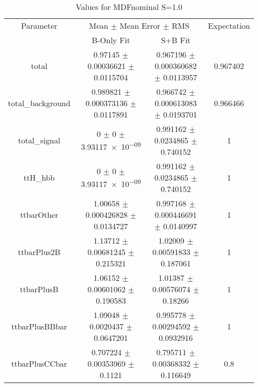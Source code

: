 \begin{table}
\centering
\caption{Values for MDFnominal S=1.0}
\begin{tabular}{cccc}
\toprule
Parameter & \multicolumn{2}{c}{Mean $\pm$ Mean Error $\pm$ RMS} & Expectation\\
 & B-Only Fit & S+B Fit & \\
\midrule
total & \num{0.97145} $\pm$ \num{0.00036621} $\pm$ \num{0.0115704} & \num{0.967196} $\pm$ \num{0.000360682} $\pm$ \num{0.0113957} & \num{0.967402}\\
total\_background & \num{0.989821} $\pm$ \num{0.000373136} $\pm$ \num{0.0117891} & \num{0.966742} $\pm$ \num{0.000613083} $\pm$ \num{0.0193701} & \num{0.966466}\\
total\_signal & \num{0} $\pm$ \num{0} $\pm$ \num{3.93117e-09} & \num{0.991162} $\pm$ \num{0.0234865} $\pm$ \num{0.740152} & \num{1}\\
ttH\_hbb & \num{0} $\pm$ \num{0} $\pm$ \num{3.93117e-09} & \num{0.991162} $\pm$ \num{0.0234865} $\pm$ \num{0.740152} & \num{1}\\
ttbarOther & \num{1.00658} $\pm$ \num{0.000426828} $\pm$ \num{0.0134727} & \num{0.997168} $\pm$ \num{0.000446691} $\pm$ \num{0.0140997} & \num{1}\\
ttbarPlus2B & \num{1.13712} $\pm$ \num{0.00681245} $\pm$ \num{0.215321} & \num{1.02009} $\pm$ \num{0.00591833} $\pm$ \num{0.187061} & \num{1}\\
ttbarPlusB & \num{1.06152} $\pm$ \num{0.00601062} $\pm$ \num{0.190583} & \num{1.01387} $\pm$ \num{0.00576074} $\pm$ \num{0.18266} & \num{1}\\
ttbarPlusBBbar & \num{1.09048} $\pm$ \num{0.0020437} $\pm$ \num{0.0647201} & \num{0.995778} $\pm$ \num{0.00294592} $\pm$ \num{0.0932916} & \num{1}\\
ttbarPlusCCbar & \num{0.707224} $\pm$ \num{0.00353969} $\pm$ \num{0.1121} & \num{0.795711} $\pm$ \num{0.00368332} $\pm$ \num{0.116649} & \num{0.8}\\
\bottomrule
\end{tabular}
\end{table}